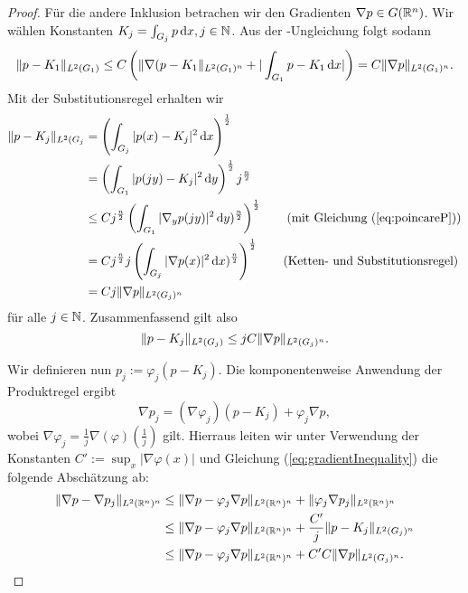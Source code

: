 \begin{proof}
  Für die andere Inklusion betrachen wir den Gradienten $\nabla p \in G(\mathbb{R}^n)$.
  Wir wählen Konstanten $K_j = \int_{G_j} p \, {\operatorname{d}\!{x}}, j \in \mathbb{N}$.
  Aus der \poincare\hyp{}Ungleichung \cite[S.44, Lemma 1.1.2]{sohr2001navier} folgt sodann
  \begin{equation}
    \label{eq:poincareP}
  \lVert p - K_1 \rVert_{L^2(G_1)} \leq C \left(\lVert \nabla (p - K_1 \rVert_{L^2(G_1)^n} + | \int_{G_1} p - K_1 \, {\operatorname{d}\!{x}} |\right) =  C \lVert \nabla p \rVert_{L^2(G_1)^n}.
\end{equation}
  Mit der Substitutionsregel erhalten wir
\begin{align*}
  \norm{p - K_j}_{L^2(G_j} 
  &= \left( \int_{G_j} |p(x) - K_j|^2 \d x \right)^\frac{1}{2} \\
  &= \left( \int_{G_1} |p(jy) - K_j|^2 \d y \right)^\frac{1}{2} j^\frac{n}{2} \\
  &\leq C j^{\frac{n}{2}}\left( \int_{G_1} |\nabla_y p(jy) |^2 \d y )^{\frac{n}{2}} \right)^{\frac{1}{2}} \tag{mit Gleichung (\ref{eq:poincareP})}\\
  &= C j^{\frac{n}{2}}j \left( \int_{G_j} |\nabla p(x) |^2 \d x )^{\frac{n}{2}} \right)^{\frac{1}{2}} \tag{Ketten- und Substitutionsregel} \\
  &= C j \norm{\nabla p}_{L^2(G_j)^n}
\end{align*}
  für alle $j \in \mathbb{N}$.
  Zusammenfassend gilt also
  \begin{equation}
    \label{eq:gradientInequality}
    \lVert p - K_j \rVert_{L^2(G_j)} \leq j C\lVert \nabla p \rVert_{L^2(G_j)^n}.
  \end{equation}

  Wir definieren nun $p_j := \varphi_j (p - K_j)$.
  Die komponentenweise Anwendung der Produktregel ergibt 
  $$
  \nabla p_j =  (\nabla \varphi_j)(p - K_j) + \varphi_j \nabla p,
  $$
  wobei $\nabla \varphi_j = \frac{1}{j} \nabla(\varphi)(\frac{1}{j})$ gilt.
  Hierraus leiten wir unter Verwendung der Konstanten $C' := \sup_x |\nabla \varphi(x)|$ und Gleichung (\ref{eq:gradientInequality}) die folgende Abschätzung ab:
  \begin{align}
    \lVert \nabla p - \nabla p_j \rVert_{L^2(\mathbb{R}^n)^n}
    &\leq \lVert \nabla p - \varphi_j \nabla p \rVert_{L^2(\mathbb{R}^n)^n} + \lVert \varphi_j \nabla p_j \rVert_{L^2(\mathbb{R}^n)^n} \nonumber\\
    &\leq \lVert \nabla p - \varphi_j \nabla p \rVert_{L^2(\mathbb{R}^n)^n} + \frac{C'}{j} \lVert p - K_j \rVert_{L^2(G_j)^n}\nonumber\\
    &\leq \lVert \nabla p - \varphi_j \nabla p \rVert_{L^2(\mathbb{R}^n)^n} + C'C \lVert \nabla p \rVert_{L^2(G_j)^n} \label{eq:gradDiff}.
  \end{align}


\end{proof}
